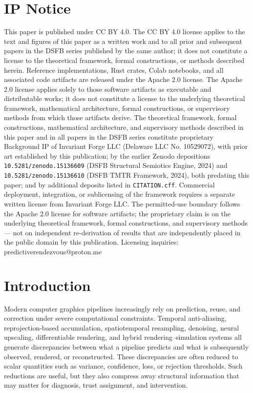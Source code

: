 \documentclass[11pt]{article}
\theoremstyle{definition}
\theoremstyle{plain}
\begin{document}
\section{IP Notice}
\label{sec:ip}
This paper is published under CC BY 4.0. The CC BY 4.0 license applies to the text and figures of this paper as a written work and to all prior and subsequent papers in the DSFB series published by the same author; it does not constitute a license to the theoretical framework, formal constructions, or methods described herein.
Reference implementations, Rust crates, Colab notebooks, and all associated code artifacts are released under the Apache 2.0 license. The Apache 2.0 license applies solely to those software artifacts as executable and distributable works; it does not constitute a license to the underlying theoretical framework, mathematical architecture, formal constructions, or supervisory methods from which those artifacts derive.
The theoretical framework, formal constructions, mathematical architecture, and supervisory methods described in this paper and in all papers in the DSFB series constitute proprietary Background IP of Invariant Forge LLC (Delaware LLC No. 10529072), with prior art established by this publication; by the earlier Zenodo depositions \texttt{10.5281/zenodo.15136609} (DSFB Structural Semiotics Engine, 2024) and \texttt{10.5281/zenodo.15136610} (DSFB TMTR Framework, 2024), both predating this paper; and by additional deposits listed in \texttt{CITATION.cff}. Commercial deployment, integration, or sublicensing of the framework requires a separate written license from Invariant Forge LLC. The permitted-use boundary follows the Apache 2.0 license for software artifacts; the proprietary claim is on the underlying theoretical framework, formal constructions, and supervisory methods — not on independent re-derivation of results that are independently placed in the public domain by this publication.
Licensing inquiries: predictiverendezvous@proton.me
\tableofcontents
\clearpage


\section{Introduction}

Modern computer graphics pipelines increasingly rely on prediction, reuse, and correction under severe computational constraints. Temporal anti-aliasing, reprojection-based accumulation, spatiotemporal resampling, denoising, neural upscaling, differentiable rendering, and hybrid rendering--simulation systems all generate discrepancies between what a pipeline predicts and what is subsequently observed, rendered, or reconstructed. These discrepancies are often reduced to scalar quantities such as variance, confidence, loss, or rejection thresholds. Such reductions are useful, but they also compress away structural information that may matter for diagnosis, trust assignment, and intervention.
\end{document}
